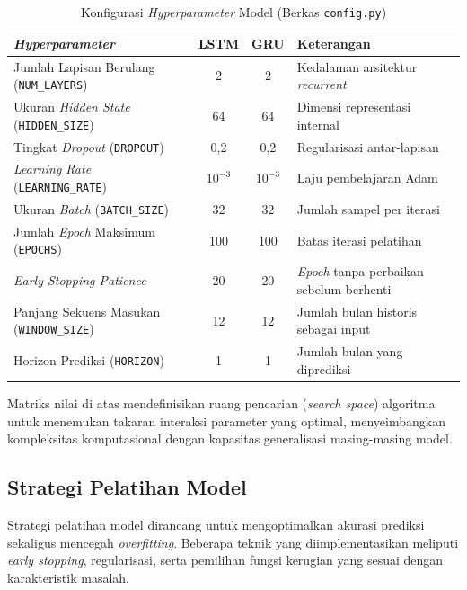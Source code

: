 \begin{table}[htbp]
\centering
\caption{Konfigurasi \textit{Hyperparameter} Model (Berkas \texttt{config.py})}
\label{tab:hyperparameter}
\begin{tabular}{|p{4.5cm}|c|c|p{4.5cm}|}
\hline
\textbf{\textit{Hyperparameter}} & \textbf{LSTM} & \textbf{GRU} & \textbf{Keterangan} \\
\hline
Jumlah Lapisan Berulang (\texttt{NUM\_LAYERS}) & 2 & 2 & Kedalaman arsitektur \textit{recurrent} \\
\hline
Ukuran \textit{Hidden State} (\texttt{HIDDEN\_SIZE}) & 64 & 64 & Dimensi representasi internal \\
\hline
Tingkat \textit{Dropout} (\texttt{DROPOUT}) & 0{,}2 & 0{,}2 & Regularisasi antar-lapisan \\
\hline
\textit{Learning Rate} (\texttt{LEARNING\_RATE}) & $10^{-3}$ & $10^{-3}$ & Laju pembelajaran Adam \\
\hline
Ukuran \textit{Batch} (\texttt{BATCH\_SIZE}) & 32 & 32 & Jumlah sampel per iterasi \\
\hline
Jumlah \textit{Epoch} Maksimum (\texttt{EPOCHS}) & 100 & 100 & Batas iterasi pelatihan \\
\hline
\textit{Early Stopping Patience} & 20 & 20 & \textit{Epoch} tanpa perbaikan sebelum berhenti \\
\hline
Panjang Sekuens Masukan (\texttt{WINDOW\_SIZE}) & 12 & 12 & Jumlah bulan historis sebagai input \\
\hline
Horizon Prediksi (\texttt{HORIZON}) & 1 & 1 & Jumlah bulan yang diprediksi \\
\hline
\end{tabular}
\end{table}

Matriks nilai di atas mendefinisikan ruang pencarian (\textit{search space}) algoritma untuk menemukan takaran interaksi parameter yang optimal, menyeimbangkan kompleksitas komputasional dengan kapasitas generalisasi masing-masing model.

\subsection{Strategi Pelatihan Model}
\label{subsec:strategi-pelatihan}

Strategi pelatihan model dirancang untuk mengoptimalkan akurasi prediksi sekaligus mencegah \textit{overfitting}. Beberapa teknik yang diimplementasikan meliputi \textit{early stopping}, regularisasi, serta pemilihan fungsi kerugian yang sesuai dengan karakteristik masalah.


